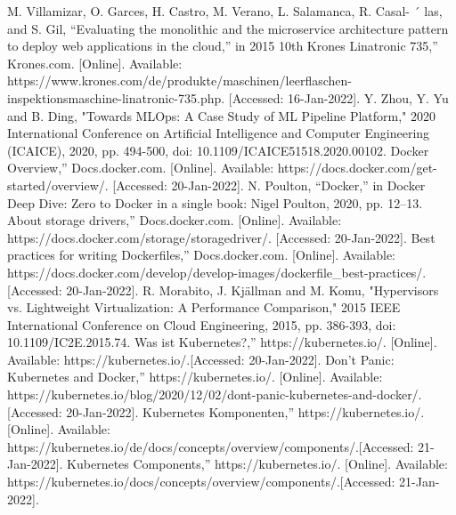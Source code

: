 \documentclass[12pt,oneside]{report}
\begin{document}
 
  \begin{thebibliography}{10}
     M. Villamizar, O. Garces, H. Castro, M. Verano, L. Salamanca, R. Casal- ´
    las, and S. Gil, “Evaluating the monolithic and the microservice architecture pattern to deploy web applications in the cloud,” in 2015 10th
     Krones Linatronic 735,” Krones.com. [Online].
    Available: https://www.krones.com/de/produkte/maschinen/leerflaschen-inspektionsmaschine-linatronic-735.php. [Accessed: 16-Jan-2022].
     Y. Zhou, Y. Yu and B. Ding, "Towards MLOps: A Case Study of ML Pipeline Platform," 2020 International Conference on Artificial Intelligence and Computer Engineering (ICAICE), 2020, pp. 494-500, doi: 10.1109/ICAICE51518.2020.00102.
     Docker Overview,” Docs.docker.com. [Online].
    Available: https://docs.docker.com/get-started/overview/. [Accessed: 20-Jan-2022].
    N. Poulton, “Docker,” in Docker Deep Dive: Zero to Docker in a single book: Nigel Poulton, 2020, pp. 12–13. 
     About storage drivers,” Docs.docker.com. [Online].
    Available: https://docs.docker.com/storage/storagedriver/. [Accessed: 20-Jan-2022].
     Best practices for writing Dockerfiles,” Docs.docker.com. [Online]. 
    Available: https://docs.docker.com/develop/develop-images/dockerfile\_best-practices/.[Accessed: 20-Jan-2022].
     R. Morabito, J. Kjällman and M. Komu, "Hypervisors vs. Lightweight Virtualization: A Performance Comparison," 2015 IEEE International Conference on Cloud Engineering, 2015, pp. 386-393, doi: 10.1109/IC2E.2015.74.
     Was ist Kubernetes?,” https://kubernetes.io/. [Online]. 
    Available: https://kubernetes.io/.[Accessed: 20-Jan-2022].
     Don't Panic: Kubernetes and Docker,” https://kubernetes.io/. [Online]. 
    Available: https://kubernetes.io/blog/2020/12/02/dont-panic-kubernetes-and-docker/.[Accessed: 20-Jan-2022].
     Kubernetes Komponenten,” https://kubernetes.io/. [Online]. 
    Available: https://kubernetes.io/de/docs/concepts/overview/components/.[Accessed: 21-Jan-2022].
     Kubernetes Components,” https://kubernetes.io/. [Online]. 
    Available: https://kubernetes.io/docs/concepts/overview/components/.[Accessed: 21-Jan-2022].

\end{thebibliography}
\end{document}
